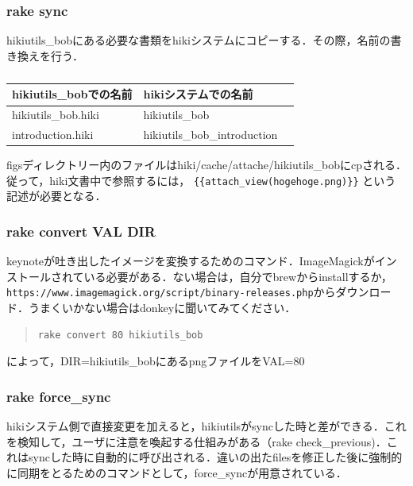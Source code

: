 \subsubsection{rake sync}
hikiutils\_bobにある必要な書類をhikiシステムにコピーする．その際，名前の書き換えを行う．

\begin{table}[htbp]\begin{center}
\caption{}
\begin{tabular}{lll}
\hline
hikiutils\_bobでの名前   &hikiシステムでの名前  \\ \hline
hikiutils\_bob.hiki   &hikiutils\_bob  \\
introduction.hiki   &hikiutils\_bob\_introduction  \\
\hline
\end{tabular}
\label{default}
\end{center}\end{table}

figsディレクトリー内のファイルはhiki/cache/attache/hikiutils\_bobにcpされる．従って，hiki文書中で参照するには，
\verb|{{attach_view(hogehoge.png)}}|
という記述が必要となる．

\subsubsection{rake convert VAL DIR}
keynoteが吐き出したイメージを変換するためのコマンド．ImageMagickがインストールされている必要がある．ない場合は，自分でbrewからinstallするか，\verb|https://www.imagemagick.org/script/binary-releases.php|からダウンロード．うまくいかない場合はdonkeyに聞いてみてください．
\begin{quote}\begin{verbatim}
rake convert 80 hikiutils_bob
\end{verbatim}\end{quote}
によって，DIR=hikiutils\_bobにあるpngファイルをVAL=80%

\subsubsection{rake force\_sync}
hikiシステム側で直接変更を加えると，hikiutilsがsyncした時と差ができる．これを検知して，ユーザに注意を喚起する仕組みがある（rake check\_previous)．これはsyncした時に自動的に呼び出される．違いの出たfilesを修正した後に強制的に同期をとるためのコマンドとして，force\_syncが用意されている．


